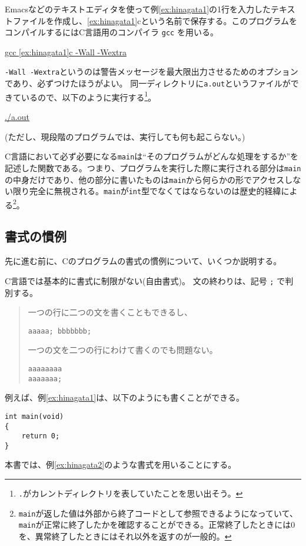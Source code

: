 Emacsなどのテキストエディタを使って例\ref{ex:hinagata1}の1行を入力したテキストファイルを作成し、\ref{ex:hinagata1}cという名前で保存する。このプログラムをコンパイルするにはC言語用のコンパイラ \texttt{gcc} を用いる。
\begin{commandline2}
    \prompt \underline{gcc \ref{ex:hinagata1}c -Wall -Wextra}
\end{commandline2} \noindent
\texttt{-Wall -Wextra}というのは警告メッセージを最大限出力させるためのオプションであり、必ずつけたほうがよい。
同一ディレクトリに\texttt{a.out}というファイルができているので、以下のように実行する\footnote{\texttt{.}がカレントディレクトリを表していたことを思い出そう。}。
\begin{commandline2}
    \prompt \underline{./a.out}
\end{commandline2} \noindent
(ただし、現段階のプログラムでは、実行しても何も起こらない。)

C言語において必ず必要になる\texttt{main}は``そのプログラムがどんな処理をするか''を記述した関数である。つまり、プログラムを実行した際に実行される部分は\texttt{main}の中身だけであり、他の部分に書いたものは\texttt{main}から何らかの形でアクセスしない限り完全に無視される。\texttt{main}が\texttt{int}型でなくてはならないのは歴史的経緯による\footnote{\texttt{main}が返した値は外部から終了コードとして参照できるようになっていて、\texttt{main}が正常に終了したかを確認することができる。正常終了したときには0を、異常終了したときにはそれ以外を返すのが一般的。}。

\subsection{書式の慣例}

先に進む前に、Cのプログラムの書式の慣例について、いくつか説明する。

C言語では基本的に書式に制限がない(自由書式)。
文の終わりは、記号 \texttt{;} で判別する。
\begin{quote}
    一つの行に二つの文を書くこともできるし、
    \begin{verbatim}
aaaaa; bbbbbbb;
\end{verbatim}
    一つの文を二つの行にわけて書くのでも問題ない。
    \begin{verbatim}
aaaaaaaa
aaaaaaa;
\end{verbatim}
\end{quote}
例えば、例\ref{ex:hinagata1}は、以下のようにも書くことができる。
\begin{reidai}\label{ex:hinagata2}
    \begin{verbatim}
int main(void)
{
    return 0;
}
\end{verbatim}
\end{reidai} \noindent
本書では、例\ref{ex:hinagata2}のような書式を用いることにする。

